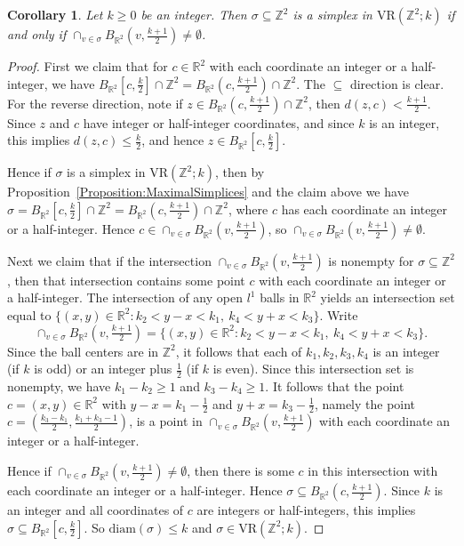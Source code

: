 \documentclass[12pt,a4paper]{amsart}
\newtheorem{corollary}[theorem]{Corollary}
\theoremstyle{definition}
\newcommand{\R}{\ensuremath{\mathbb{R}}}
\newcommand{\Z}{\ensuremath{\mathbb{Z}}}
\newcommand{\vr}[2]{\mathrm{VR}(#1;#2)}
\newcommand{\diam}{\ensuremath{\mathrm{diam}}}
\numberwithin{equation}{section}
\begin{document}
\begin{corollary}
\label{Corollary:NerveZ2}
Let $k\ge 0$ be an integer.
Then $\sigma\subseteq \Z^2$ is a simplex in $\vr{\Z^2}{k}$ if and only if $\cap_{v\in\sigma}B_{\R^2}(v,\frac{k+1}{2}) \neq \emptyset$.
\end{corollary}

\begin{proof}
First we claim that for $c\in \R^2$ with each coordinate an integer or a half-integer, we have $B_{\R^2}[c,\frac{k}{2}] \cap \Z^2 = B_{\R^2}(c,\frac{k+1}{2}) \cap \Z^2$.
The $\subseteq$ direction is clear.
For the reverse direction, note if $z\in B_{\R^2}(c,\frac{k+1}{2}) \cap \Z^2$, then $d(z,c)<\frac{k+1}{2}$.
Since $z$ and $c$ have integer or half-integer coordinates, and since $k$ is an integer, this implies $d(z,c)\le\frac{k}{2}$, and hence $z\in B_{\R^2}[c,\frac{k}{2}]$.

Hence if $\sigma$ is a simplex in $\vr{\Z^2}{k}$, then by Proposition~\ref{Proposition:MaximalSimplices} and the claim above we have $\sigma = B_{\R^2}[c,\frac{k}{2}] \cap \Z^2 = B_{\R^2}(c,\frac{k+1}{2}) \cap \Z^2$, where $c$ has each coordinate an integer or a half-integer.
Hence $c\in \cap_{v\in\sigma}B_{\R^2}(v,\frac{k+1}{2})$, so $\cap_{v\in\sigma}B_{\R^2}(v,\frac{k+1}{2}) \neq \emptyset$.

Next we claim that if the intersection $\cap_{v\in\sigma}B_{\R^2}(v,\frac{k+1}{2})$ is nonempty for $\sigma\subseteq \Z^2$, then that intersection contains some point $c$ with each coordinate an integer or a half-integer.
The intersection of any open $l^1$ balls in $\R^2$ yields an intersection set equal to $\{(x,y)\in\R^2 : k_2 < y-x < k_1 ,\ k_4 < y+x < k_3\}$.
Write
\[ \cap_{v\in\sigma}B_{\R^2}(v,\tfrac{k+1}{2}) = \{(x,y)\in\R^2 : k_2 < y-x < k_1 ,\ k_4 < y+x < k_3\}.\]
Since the ball centers are in $\Z^2$, it follows that each of $k_1,k_2,k_3,k_4$ is an integer (if $k$ is odd) or an integer plus $\frac{1}{2}$ (if $k$ is even).
Since this intersection set is nonempty, we have $k_1-k_2\ge 1$ and $k_3-k_4\ge 1$.
It follows that the point $c=(x,y)\in\R^2$ with $y-x=k_1-\frac{1}{2}$ and $y+x=k_3-\frac{1}{2}$, namely the point $c=(\frac{k_3-k_1}{2},\frac{k_1+k_3-1}{2})$, is a point in $\cap_{v\in\sigma}B_{\R^2}(v,\frac{k+1}{2})$ with each coordinate an integer or a half-integer.

Hence if $\cap_{v\in\sigma}B_{\R^2}(v,\frac{k+1}{2}) \neq \emptyset$, then there is some $c$ in this intersection with each coordinate an integer or a half-integer.
Hence $\sigma \subseteq B_{\R^2}(c,\frac{k+1}{2})$.
Since $k$ is an integer and all coordinates of $c$ are integers or half-integers, this implies $\sigma \subseteq B_{\R^2}[c,\frac{k}{2}]$.
So $\diam(\sigma)\le k$ and $\sigma\in \vr{\Z^2}{k}$.
\end{proof}
\end{document}
